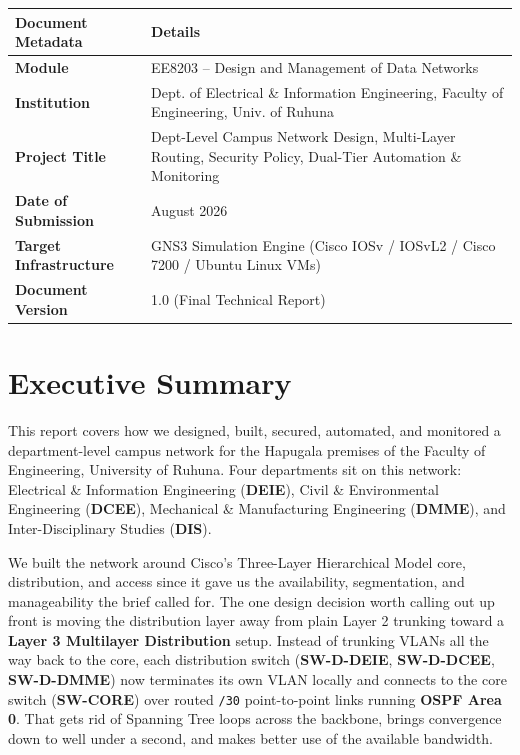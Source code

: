 \documentclass[11pt,a4paper]{article}
\newcommand{\hr}{\vspace{0.2cm}\noindent\hrulefill\vspace{0.2cm}}
\begin{document}
\noindent
\begin{table}[htbp]
\centering
\begin{tabular}{|p{}|p{}|}
\hline
\textbf{Document Metadata} & \textbf{Details} \\
\hline
\textbf{Module} & EE8203 -- Design and Management of Data Networks \\
\textbf{Institution} & Dept. of Electrical \& Information Engineering, Faculty of Engineering, Univ. of Ruhuna \\
\textbf{Project Title} & Dept-Level Campus Network Design, Multi-Layer Routing, Security Policy, Dual-Tier Automation \& Monitoring \\
\textbf{Date of Submission} & August 2026 \\
\textbf{Target Infrastructure} & GNS3 Simulation Engine (Cisco IOSv / IOSvL2 / Cisco 7200 / Ubuntu Linux VMs) \\
\textbf{Document Version} & 1.0 (Final Technical Report) \\
\hline
\end{tabular}
\end{table}

\hr

\section{Executive Summary}

This report covers how we designed, built, secured, automated, and monitored a department-level campus network for the Hapugala premises of the Faculty of Engineering, University of Ruhuna. Four departments sit on this network: Electrical \& Information Engineering (\textbf{DEIE}), Civil \& Environmental Engineering (\textbf{DCEE}), Mechanical \& Manufacturing Engineering (\textbf{DMME}), and Inter-Disciplinary Studies (\textbf{DIS}).

We built the network around Cisco's Three-Layer Hierarchical Model core, distribution, and access since it gave us the availability, segmentation, and manageability the brief called for. The one design decision worth calling out up front is moving the distribution layer away from plain Layer 2 trunking toward a \textbf{Layer 3 Multilayer Distribution} setup. Instead of trunking VLANs all the way back to the core, each distribution switch (\textbf{SW-D-DEIE}, \textbf{SW-D-DCEE}, \textbf{SW-D-DMME}) now terminates its own VLAN locally and connects to the core switch (\textbf{SW-CORE}) over routed \texttt{/30} point-to-point links running \textbf{OSPF Area 0}. That gets rid of Spanning Tree loops across the backbone, brings convergence down to well under a second, and makes better use of the available bandwidth.
\end{document}
